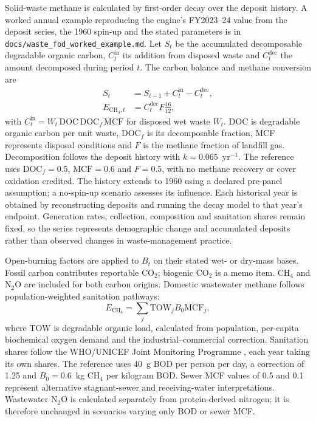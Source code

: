 \documentclass[essd]{copernicus}
\begin{document}
Solid-waste methane is calculated by first-order decay over the deposit history. A worked annual example reproducing the engine's FY2023--24 value from the deposit series, the 1960 spin-up and the stated parameters is in \texttt{docs/waste\_fod\_worked\_example.md}. Let $S_t$ be the accumulated decomposable degradable organic carbon, $C_t^{\mathrm{in}}$ its addition from disposed waste and $C_t^{\mathrm{dec}}$ the amount decomposed during period $t$. The carbon balance and methane conversion are
\begin{align}
 S_t&=S_{t-1}+C_t^{\mathrm{in}}-C_t^{\mathrm{dec}},\\
 E_{\mathrm{CH_4},t}&=C_t^{\mathrm{dec}}F\frac{16}{12},
 \label{eq:waste_fod}
\end{align}
with $C_t^{\mathrm{in}}=W_t\,\mathrm{DOC}\,\mathrm{DOC}_f\,\mathrm{MCF}$ for disposed wet waste $W_t$. DOC is degradable organic carbon per unit waste, $\mathrm{DOC}_f$ is its decomposable fraction, MCF represents disposal conditions and $F$ is the methane fraction of landfill gas. Decomposition follows the deposit history with $k=0.065$~yr$^{-1}$. The reference uses $\mathrm{DOC}_f=0.5$, $\mathrm{MCF}=0.6$ and $F=0.5$, with no methane recovery or cover oxidation credited. The history extends to 1960 using a declared pre-panel assumption; a no-spin-up scenario assesses its influence. Each historical year is obtained by reconstructing deposits and running the decay model to that year's endpoint. Generation rates, collection, composition and sanitation shares remain fixed, so the series represents demographic change and accumulated deposits rather than observed changes in waste-management practice.

Open-burning factors are applied to $B_t$ on their stated wet- or dry-mass bases. Fossil carbon contributes reportable CO$_2$; biogenic CO$_2$ is a memo item. CH$_4$ and N$_2$O are included for both carbon origins. Domestic wastewater methane follows population-weighted sanitation pathways:
\begin{equation}
 E_{\mathrm{CH_4}}=\sum_j \mathrm{TOW}_j B_0\mathrm{MCF}_j,
 \label{eq:wastewater_methane}
\end{equation}
where TOW is degradable organic load, calculated from population, per-capita biochemical oxygen demand and the industrial--commercial correction. Sanitation shares follow the WHO/UNICEF Joint Monitoring Programme \citep{JMP2023}, each year taking its own shares. The reference uses 40~g BOD per person per day, a correction of 1.25 and $B_0=0.6$~kg CH$_4$ per kilogram BOD. Sewer MCF values of 0.5 and 0.1 represent alternative stagnant-sewer and receiving-water interpretations. Wastewater N$_2$O is calculated separately from protein-derived nitrogen; it is therefore unchanged in scenarios varying only BOD or sewer MCF.
\end{document}
